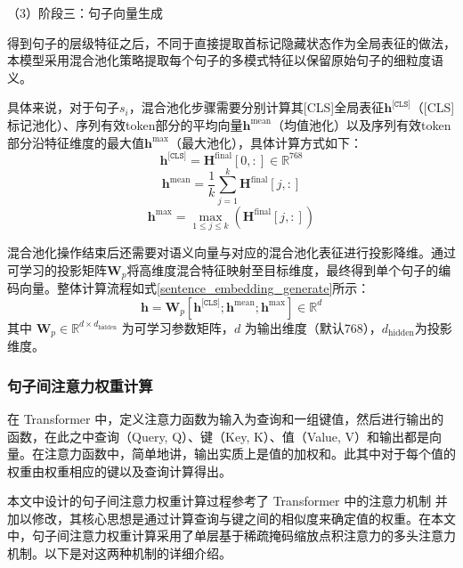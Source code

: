 （3）阶段三：句子向量生成

得到句子的层级特征之后，不同于直接提取首标记隐藏状态作为全局表征的做法，本模型采用混合池化策略提取每个句子的多模式特征以保留原始句子的细粒度语义。

具体来说，对于句子$s_i$，混合池化步骤需要分别计算其[CLS]全局表征$\textbf{h}^\texttt{[CLS]}$（[CLS] 标记池化）、序列有效token部分的平均向量$\textbf{h}^\text{mean}$（均值池化）以及序列有效token部分沿特征维度的最大值$\textbf{h}^\text{max}$（最大池化），具体计算方式如下：
\begin{equation}
    \textbf{h}^\texttt{[CLS]} = \textbf{H}^{\text{final}}[0, :] \in \mathbb{R}^{768}
\end{equation}
\begin{equation}
    \textbf{h}^{\text{mean}} = \frac{1}{k} \sum_{j=1}^{k} \textbf{H}^{\text{final}}[j, :]
\end{equation}
\begin{equation}
    \textbf{h}^{\text{max}} = \max_{1 \leq j \leq k} (\textbf{H}^{\text{final}}[j, :])
\end{equation}

混合池化操作结束后还需要对语义向量与对应的混合池化表征进行投影降维。通过可学习的投影矩阵$\textbf{W}_p$将高维度混合特征映射至目标维度，最终得到单个句子的编码向量。整体计算流程如式\ref{sentence_embedding_generate}所示：
\begin{equation}\label{sentence_embedding_generate}
    \textbf{h} = \textbf{W}_p[\textbf{h}^\texttt{[CLS]}; \textbf{h}^{\text{mean}}; \textbf{h}^{\text{max}}] \in \mathbb{R}^d
\end{equation}
其中 $\textbf{W}_p \in \mathbb{R}^{d \times d_\text{hidden}}$ 为可学习参数矩阵，$d$ 为输出维度（默认768），$d_\text{hidden}$为投影维度。

\subsubsection{句子间注意力权重计算}

在 Transformer 中，定义注意力函数为输入为查询和一组键值，然后进行输出的函数，在此之中查询（Query, Q）、键（Key, K）、值（Value, V）和输出都是向量。在注意力函数中，简单地讲，输出实质上是值的加权和。此其中对于每个值的权重由权重相应的键以及查询计算得出。

本文中设计的句子间注意力权重计算过程参考了 Transformer 中的注意力机制 \cite{transformer} 并加以修改，其核心思想是通过计算查询与键之间的相似度来确定值的权重。在本文中，句子间注意力权重计算采用了单层基于稀疏掩码缩放点积注意力的多头注意力机制。以下是对这两种机制的详细介绍。


